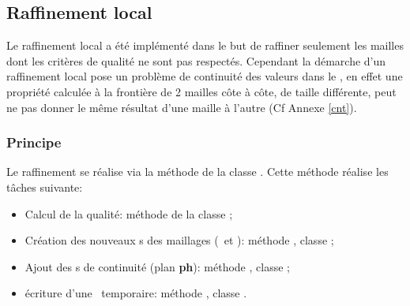     \subsection{Raffinement local}\label{raflocal}
    
    Le raffinement local a été implémenté dans le but de raffiner seulement les mailles dont les critères de qualité ne sont pas respectés.
    Cependant la démarche d'un raffinement local pose un problème de continuité des valeurs dans le \pph, en effet une propriété calculée à la 
    frontière de 2 mailles côte à côte, de taille différente, peut ne pas donner le même résultat d'une maille à l'autre (Cf Annexe \ref{cnt}). 
      
      \subsubsection{Principe}
      Le raffinement se réalise via la méthode  de la classe \IGEN.
      Cette méthode réalise les tâches suivante:
      \vspace{0.3cm}
      \begin{itemize}
       \item Calcul de la qualité: méthode  de la classe \IGEN;
       \item Création des nouveaux \n s des maillages (\pph\ et \sgp): méthode , classe \MESH;
       \item Ajout des \n s de continuité (plan \textbf{ph}): méthode , classe \MESH;
       \item écriture d'une \bdd\ temporaire: méthode , classe \IGEN.
      \end{itemize}
      \vspace{0.5cm}
      
